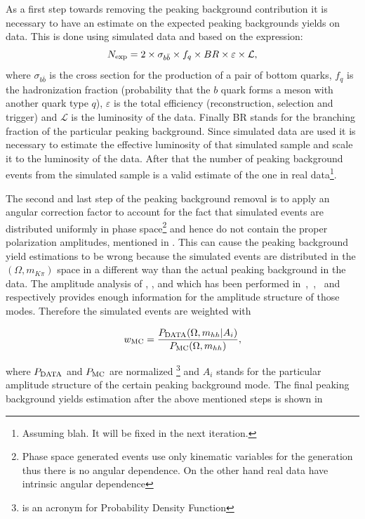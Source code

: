 As a first step towards removing the peaking background contribution it is necessary to have an estimate on the expected
peaking backgrounds yields on data. This is done using simulated data and based on the expression:
\begin{equation}
N_{\rm exp} = 2 \times \sigma_{b\bar{b}}\times f_q \times BR \times \varepsilon \times {\mathcal{L}},
\end{equation}
\noindent where $\sigma_{b\bar{b}}$ is the cross section for the production of a pair of bottom quarks, $f_q$ is the hadronization fraction
(probability that the $b$ quark forms a meson with another quark type $q$), $\varepsilon$ is the total efficiency (reconstruction, selection and trigger)
and ${\mathcal{L}}$ is the luminosity of the data. Finally BR stands for the branching fraction of the particular peaking background. Since simulated data are used
it is necessary to estimate the effective luminosity of that simulated sample and scale it to the luminosity of the data. After that the number of
peaking background events from the simulated sample is a valid estimate of the one in real
data\footnote{Assuming blah. {\color{red} It will be fixed in the next iteration.}}.

The second and last step of the peaking background removal is to apply an angular correction factor to account for the fact that
simulated events are distributed uniformly in phase
space\footnote{Phase space generated events use only kinematic variables for the generation
thus there is no angular dependence. On the other hand real data have intrinsic angular dependence}
and hence do not contain the proper polarization amplitudes, mentioned in .
This can cause the peaking background yield estimations to be wrong because the simulated events are distributed in the $(\Omega, m_{K\pi})$ space
in a different way than the actual peaking background in the data. The amplitude analysis of \BdJpsipipi, \BsJpsipipi, \BsJpsiKK and \LbJpsipK
which has been performed in~\cite{SheldonBdpipi},~\cite{SheldonBspipi},~\cite{SheldonKK} and~\cite{Gao:1701984} respectively provides enough information
for the amplitude structure of those modes. Therefore the simulated events are weighted with

\begin{equation}
w_{\rm MC} = \frac{P_{\rm DATA} (\Omega, m_{hh}  | {A_i})}{P_{\rm MC}(\Omega, m_{hh})},
\end{equation}

\noindent where $P_{\rm DATA}$ and $P_{\rm MC}$ are normalized \pdfs\footnote{\pdf is an acronym for Probability Density Function} and $A_i$ stands for
the particular amplitude structure of the certain peaking background mode.
The final peaking background yields estimation after the above mentioned steps is shown in 

